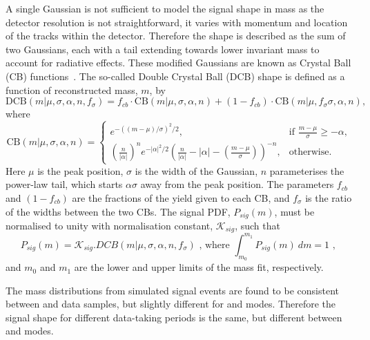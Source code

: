 A single Gaussian is not sufficient to model the signal shape in \Bm mass as the detector resolution is not straightforward, it varies with momentum and location of the tracks within the detector. Therefore the shape is described as the sum of two Gaussians, each with a tail extending towards lower invariant mass to account for radiative effects. These modified Gaussians are known as Crystal Ball (CB) functions~\cite{Skwarnicki:1986xj}. The so-called Double Crystal Ball (DCB) shape is defined as a function of reconstructed mass, $m$, by
\begin{equation}
\mathrm{DCB}(m| \mu,\sigma,\alpha,n,f_{\sigma}) = f_{cb} \cdot \mathrm{CB}(m| \mu,\sigma,\alpha,n) + (1-f_{cb}) \cdot \mathrm{CB}(m|\mu,f_{\sigma}\sigma,\alpha,n),
\label{DCBshape}
\end{equation}
where
\begin{equation*}
  \mathrm{CB}(m| \mu,\sigma,\alpha,n)=
\begin{cases}
    e^{-((m-\mu)/ \sigma)^2/2},                                   & \text{if } \frac{m-\mu}{\sigma} \geq - \alpha, \\
   \left ( \frac{n}{|\alpha|} \right ) ^n e^{-|\alpha|^2/2} \left ( \frac{n}{|\alpha|} - |\alpha| - \left ( \frac{m-\mu}{\sigma} \right ) \right ) ^{-n} ,    & \text{otherwise.}
\end{cases}
\end{equation*}
Here $\mu$ is the peak position, $\sigma$ is the width of the Gaussian, $n$ parameterises the power-law tail, which starts $\alpha\sigma$ away from the peak position. The parameters $f_{cb}$ and $(1-f_{cb})$ are the fractions of the yield given to each CB, and $f_{\sigma}$ is the ratio of the widths between the two CBs. The signal PDF, $P_{sig}(m)$, must be normalised to unity with normalisation constant, $\mathcal{K}_{sig}$, such that
\begin{equation}
P_{sig}(m) = \mathcal{K}_{sig} . DCB(m| \mu,\sigma,\alpha,n,f_{\sigma}) \text{ ,	where } \int_{m_0}^{m_1} P_{sig}(m)\ dm = 1 \text{ , }
\end{equation}
and $m_0$ and $m_1$ are the lower and upper limits of the mass fit, respectively.

The \Bm mass distributions from simulated signal events are found to be consistent between \runone and \runtwo data samples, but slightly different for \kpi and \kpipipi modes. Therefore the signal shape for different data-taking periods is the same, but different between \kpi and \kpipipi modes. 

